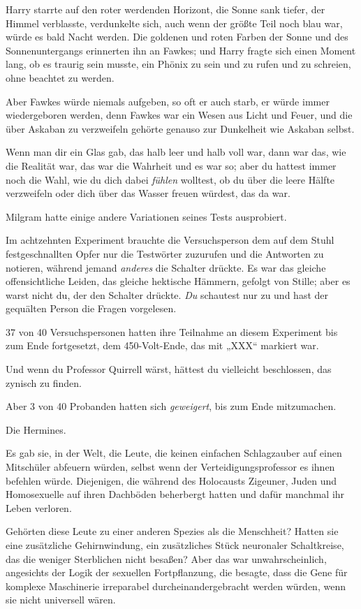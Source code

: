 {Harry starrte auf den roter werdenden Horizont, die Sonne sank tiefer, der Himmel verblasste, verdunkelte sich, auch wenn der größte Teil noch blau war, würde es bald Nacht werden. Die goldenen und roten Farben der Sonne und des Sonnenuntergangs erinnerten ihn an Fawkes; und Harry fragte sich einen Moment lang, ob es traurig sein musste, ein Phönix zu sein und zu rufen und zu schreien, ohne beachtet zu werden.

Aber Fawkes würde niemals aufgeben, so oft er auch starb, er würde immer wiedergeboren werden, denn Fawkes war ein Wesen aus Licht und Feuer, und die über Askaban zu verzweifeln gehörte genauso zur Dunkelheit wie Askaban selbst.

Wenn man dir ein Glas gab, das halb leer und halb voll war, dann war das, wie die Realität war, das war die Wahrheit und es war so; aber du hattest immer noch die Wahl, wie du dich dabei \emph{fühlen} wolltest, ob du über die leere Hälfte verzweifeln oder dich über das Wasser freuen würdest, das da war.

Milgram hatte einige andere Variationen seines Tests ausprobiert.

Im achtzehnten Experiment brauchte die Versuchsperson dem auf dem Stuhl festgeschnallten Opfer nur die Testwörter zuzurufen und die Antworten zu notieren, während jemand \emph{anderes} die Schalter drückte. Es war das gleiche offensichtliche Leiden, das gleiche hektische Hämmern, gefolgt von Stille; aber es warst nicht du, der den Schalter drückte. \emph{Du} schautest nur zu und hast der gequälten Person die Fragen vorgelesen.

37 von 40 Versuchspersonen hatten ihre Teilnahme an diesem Experiment bis zum Ende fortgesetzt, dem 450-Volt-Ende, das mit „XXX“ markiert war.

Und wenn du Professor Quirrell wärst, hättest du vielleicht beschlossen, das zynisch zu finden.

Aber 3 von 40 Probanden hatten sich \emph{geweigert}, bis zum Ende mitzumachen.

Die Hermines.

Es gab sie, in der Welt, die Leute, die keinen einfachen Schlagzauber auf einen Mitschüler abfeuern würden, selbst wenn der Verteidigungsprofessor es ihnen befehlen würde. Diejenigen, die während des Holocausts Zigeuner, Juden und Homosexuelle auf ihren Dachböden beherbergt hatten und dafür manchmal ihr Leben verloren.

Gehörten diese Leute zu einer anderen Spezies als die Menschheit? Hatten sie eine zusätzliche Gehirnwindung, ein zusätzliches Stück neuronaler Schaltkreise, das die weniger Sterblichen nicht besaßen? Aber das war unwahrscheinlich, angesichts der Logik der sexuellen Fortpflanzung, die besagte, dass die Gene für komplexe Maschinerie irreparabel durcheinandergebracht werden würden, wenn sie nicht universell wären.

}
